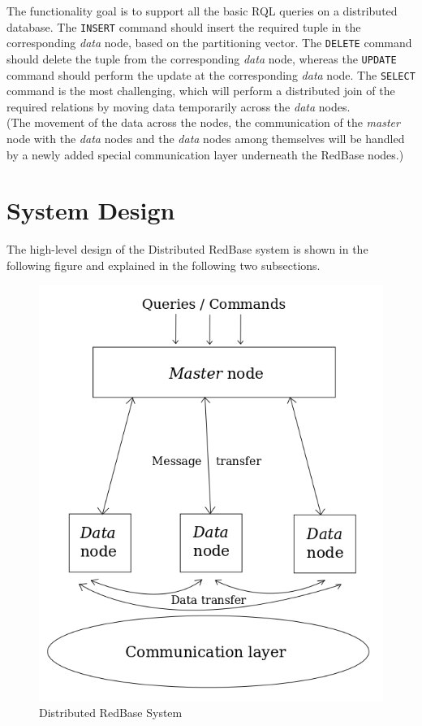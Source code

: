 \documentclass[letterpaper,11pt]{article}
\begin{document}
The functionality goal is to support all the basic RQL queries on a distributed database. The
\texttt{INSERT} command should insert the required tuple in the corresponding \textit{data} node,
based on the partitioning vector. The \texttt{DELETE} command should delete the tuple from the
corresponding \textit{data} node, whereas the \texttt{UPDATE} command should perform the update
at the corresponding \textit{data} node. The \texttt{SELECT} command is the most challenging,
which will perform a distributed join of the required relations by moving data temporarily across
the \textit{data} nodes.\\

(The movement of the data across the nodes, the communication of the \textit{master} node with
the \textit{data} nodes and the \textit{data} nodes among themselves will be handled by a
newly added special communication layer underneath the RedBase nodes.)

\section{System Design}
The high-level design of the Distributed RedBase system is shown in the following figure and
explained in the following two subsections.

\begin{figure}[h!]
\centering
\includegraphics[scale=0.4]{fig1}
\caption{Distributed RedBase System \label{fig:fig1}}
\end{figure}
\end{document}
